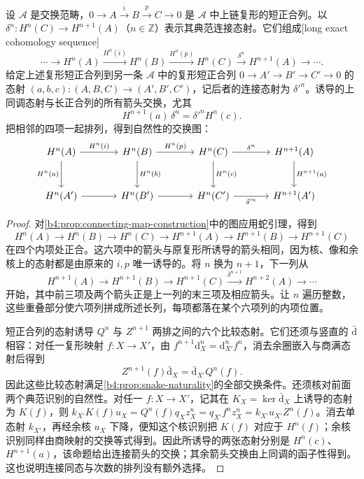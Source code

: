 \begin{theorem}[上同调长正合列]\label{b4:thm:cohomology-long-exact}
	设 \(\mathcal A\) 是交换范畴，\(0\to A\xrightarrow{i}B\xrightarrow{p}C\to0\) 是 \(\mathcal A\) 中上链复形的短正合列。以 \(\delta^n:H^n(C)\to H^{n+1}(A)\)（\(n\in\mathbb Z\)）表示其典范连接态射。它们组成[long exact cohomology sequence]
	\[
		\cdots\longrightarrow H^n(A)\xrightarrow{H^n(i)}H^n(B) \xrightarrow{H^n(p)}H^n(C)\xrightarrow{\delta^n}H^{n+1}(A) \longrightarrow\cdots.
	\]
	给定上述复形短正合列到另一条 \(\mathcal A\) 中的复形短正合列 \(0\to A'\to B'\to C'\to0\) 的态射 \((a,b,c):(A,B,C)\to(A',B',C')\)，记后者的连接态射为 \(\delta'^n\)。诱导的上同调态射与长正合列的所有箭头交换，尤其
	\[
		H^{n+1}(a)\,\delta^n=\delta'^n H^n(c).
	\]
	把相邻的四项一起排列，得到自然性的交换图：
	\[
		\begin{tikzcd}[column sep=large,row sep=large]
			H^n(A)\arrow[r,"H^n(i)"]\arrow[d,"H^n(a)"']&H^n(B)\arrow[r,"H^n(p)"]\arrow[d,"H^n(b)"]&H^n(C)\arrow[r,"\delta^n"]\arrow[d,"H^n(c)"]&H^{n+1}(A)\arrow[d,"H^{n+1}(a)"]\\
			H^n(A')\arrow[r]&H^n(B')\arrow[r]&H^n(C')\arrow[r,"\delta'^n"']&H^{n+1}(A')
		\end{tikzcd}
	\]
\end{theorem}
\begin{proof}
	对\cref{b4:prop:connecting-map-construction}中的图应用蛇引理，得到
	\[
		H^n(A)\to H^n(B)\to H^n(C)\to H^{n+1}(A)\to H^{n+1}(B)\to H^{n+1}(C)
	\]
	在四个内项处正合。这六项中的箭头与原复形所诱导的箭头相同，因为核、像和余核上的态射都是由原来的 \(i,p\) 唯一诱导的。将 \(n\) 换为 \(n+1\)，下一列从
	\[
		H^{n+1}(A)\to H^{n+1}(B)\to H^{n+1}(C) \xrightarrow{\delta^{n+1}}H^{n+2}(A)\to\cdots
	\]
	开始，其中前三项及两个箭头正是上一列的末三项及相应箭头。让 \(n\) 遍历整数，这些重叠部分使六项列拼成所述长列，每项都落在某个六项列的内项位置。

	短正合列的态射诱导 \(Q^n\) 与 \(Z^{n+1}\) 两排之间的六个比较态射。它们还须与竖直的 \(\bar{\mathrm{d}}\) 相容：对任一复形映射 \(f:X\to X'\)，由 \(f^{n+1}\mathrm{d}_X^n=\mathrm{d}_{X'}^nf^n\)，消去余圈嵌入与商满态射后得到
	\[
		Z^{n+1}(f)\bar{\mathrm{d}}_X =\bar{\mathrm{d}}_{X'}Q^n(f).
	\]
	因此这些比较态射满足\cref{b4:prop:snake-naturality}的全部交换条件。还须核对前面两个典范识别的自然性。对任一 \(f:X\to X'\)，记其在 \(K_X=\ker\bar{\mathrm{d}}_X\) 上诱导的态射为 \(K(f)\)，则 \(k_{X'}K(f)u_X=Q^n(f)q_Xz_X^n=q_{X'}f^nz_X^n=k_{X'}u_{X'}Z^n(f)\)。消去单态射 \(k_{X'}\)，再经余核 \(u_X\) 下降，便知这个核识别把 \(K(f)\) 对应于 \(H^n(f)\)；余核识别同样由商映射的交换等式得到。因此所诱导的两张态射分别是 \(H^n(c)\)、\(H^{n+1}(a)\)，该命题给出连接箭头的交换；其余箭头交换由上同调的函子性得到。这也说明连接同态与次数的排列没有额外选择。
\end{proof}

